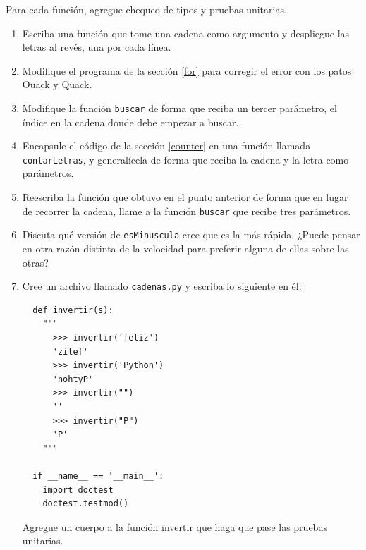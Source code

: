 Para cada función, agregue chequeo de tipos y pruebas unitarias.
\begin{enumerate}
\item Escriba una función que tome una cadena como argumento y despliegue
las letras al revés, una por cada línea.
\item Modifique el programa de la sección \ref{for} para corregir el error
con los patos Ouack y Quack.
\item Modifique la función \texttt{buscar} de forma que reciba un tercer
parámetro, el índice en la cadena donde debe empezar a buscar.
\item Encapsule el código de la sección \ref{counter} en una función llamada
\texttt{contarLetras}, y generalícela de forma que reciba la cadena
y la letra como parámetros.
\item Reescriba la función que obtuvo en el punto anterior de forma que
en lugar de recorrer la cadena, llame a la función \texttt{buscar}
que recibe tres parámetros.
\item Discuta qué versión de \texttt{esMinuscula} cree que es la más rápida.
¿Puede pensar en otra razón distinta de la velocidad para preferir
alguna de ellas sobre las otras?
\item Cree un archivo llamado \verb+cadenas.py+ y escriba lo siguiente
en él:

\begin{verbatim}
  def invertir(s):
    """
      >>> invertir('feliz')
      'zilef'
      >>> invertir('Python')
      'nohtyP'
      >>> invertir("")
      ''
      >>> invertir("P")
      'P'
    """

  if __name__ == '__main__':
    import doctest
    doctest.testmod()
\end{verbatim}
 Agregue un cuerpo a la función invertir que haga que pase las pruebas
unitarias.


\end{enumerate}
